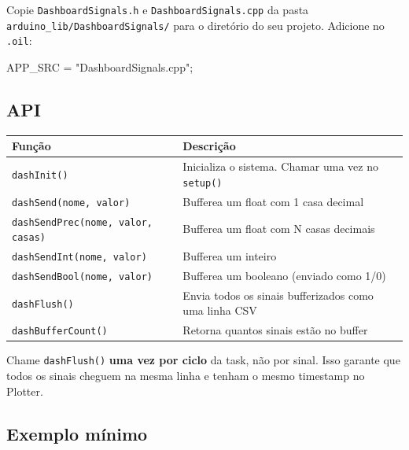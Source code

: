 \documentclass[12pt,a4paper]{article}
\begin{document}
Copie \texttt{DashboardSignals.h} e \texttt{DashboardSignals.cpp} da pasta \texttt{arduino\_lib/DashboardSignals/} para o diretório do seu projeto. Adicione no \texttt{.oil}:
\begin{codigobox}
APP\_SRC = "DashboardSignals.cpp";
\end{codigobox}

\subsection{API}

\begin{center}
\small
\begin{tabularx}{\textwidth}{lX}
  \toprule
  \textbf{Função} & \textbf{Descrição} \\
  \midrule
  \texttt{dashInit()} & Inicializa o sistema. Chamar uma vez no \texttt{setup()} \\
  \texttt{dashSend(nome, valor)} & Bufferea um float com 1 casa decimal \\
  \texttt{dashSendPrec(nome, valor, casas)} & Bufferea um float com N casas decimais \\
  \texttt{dashSendInt(nome, valor)} & Bufferea um inteiro \\
  \texttt{dashSendBool(nome, valor)} & Bufferea um booleano (enviado como 1/0) \\
  \texttt{dashFlush()} & Envia todos os sinais bufferizados como uma linha CSV \\
  \texttt{dashBufferCount()} & Retorna quantos sinais estão no buffer \\
  \bottomrule
\end{tabularx}
\end{center}

\begin{dicabox}[Importante]
Chame \texttt{dashFlush()} \textbf{uma vez por ciclo} da task, não por sinal. Isso garante que todos os sinais cheguem na mesma linha e tenham o mesmo timestamp no Plotter.
\end{dicabox}

\subsection{Exemplo mínimo}
\end{document}
